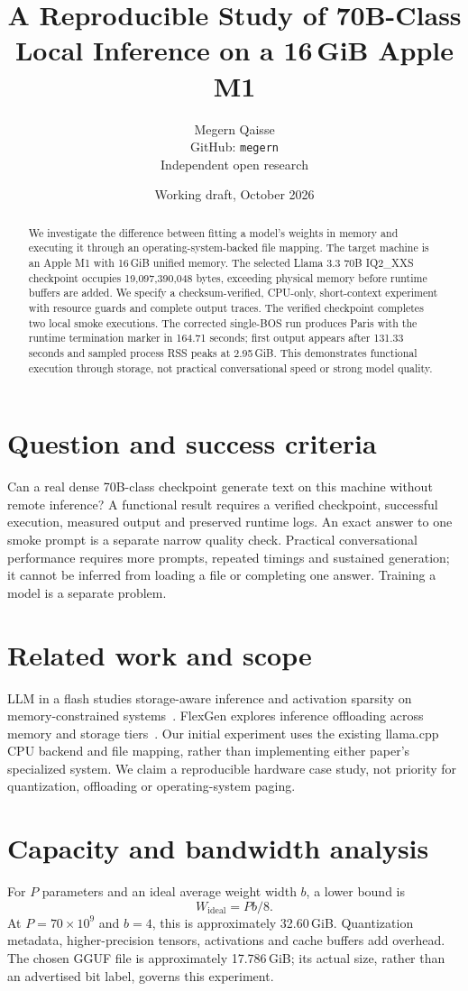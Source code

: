 \documentclass[11pt]{article}
\title{A Reproducible Study of 70B-Class Local Inference on a 16\,GiB Apple M1}
\author{Megern Qaisse\\GitHub: \texttt{megern}\\Independent open research}
\date{Working draft, October 2026}
\begin{document}
\maketitle
\begin{abstract}
We investigate the difference between fitting a model's weights in memory and executing it through an operating-system-backed file mapping. The target machine is an Apple M1 with 16\,GiB unified memory. The selected Llama 3.3 70B IQ2\_XXS checkpoint occupies 19,097,390,048 bytes, exceeding physical memory before runtime buffers are added. We specify a checksum-verified, CPU-only, short-context experiment with resource guards and complete output traces. The verified checkpoint completes two local smoke executions. The corrected single-BOS run produces Paris with the runtime termination marker in 164.71 seconds; first output appears after 131.33 seconds and sampled process RSS peaks at 2.95\,GiB. This demonstrates functional execution through storage, not practical conversational speed or strong model quality.
\end{abstract}

\section{Question and success criteria}
Can a real dense 70B-class checkpoint generate text on this machine without remote inference? A functional result requires a verified checkpoint, successful execution, measured output and preserved runtime logs. An exact answer to one smoke prompt is a separate narrow quality check. Practical conversational performance requires more prompts, repeated timings and sustained generation; it cannot be inferred from loading a file or completing one answer. Training a model is a separate problem.

\section{Related work and scope}
LLM in a flash studies storage-aware inference and activation sparsity on memory-constrained systems~\cite{flash}. FlexGen explores inference offloading across memory and storage tiers~\cite{flexgen}. Our initial experiment uses the existing llama.cpp CPU backend and file mapping, rather than implementing either paper's specialized system. We claim a reproducible hardware case study, not priority for quantization, offloading or operating-system paging.

\section{Capacity and bandwidth analysis}
For $P$ parameters and an ideal average weight width $b$, a lower bound is
\begin{equation}
 W_{\mathrm{ideal}}=Pb/8.
\end{equation}
At $P=70\times10^9$ and $b=4$, this is approximately 32.60\,GiB. Quantization metadata, higher-precision tensors, activations and cache buffers add overhead. The chosen GGUF file is approximately 17.786\,GiB; its actual size, rather than an advertised bit label, governs this experiment.
\end{document}
